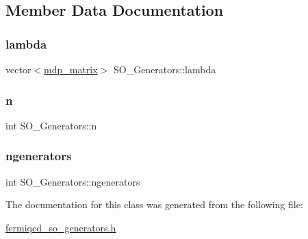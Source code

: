 \subsection{Member Data Documentation}
\mbox{\label{class_s_o___generators_af8407ee230e86dd617df950413ce01cd}} 
\subsubsection{\texorpdfstring{lambda}{lambda}}
{\footnotesize\ttfamily vector$<$\hyperlink{classmdp__matrix}{mdp\+\_\+matrix}$>$ S\+O\+\_\+\+Generators\+::lambda}

\mbox{\label{class_s_o___generators_afb2df00492fe0d24e7c862015f8e9476}} 
\subsubsection{\texorpdfstring{n}{n}}
{\footnotesize\ttfamily int S\+O\+\_\+\+Generators\+::n}

\mbox{\label{class_s_o___generators_aa44e42d7afbb4c6585c58474616781a6}} 
\subsubsection{\texorpdfstring{ngenerators}{ngenerators}}
{\footnotesize\ttfamily int S\+O\+\_\+\+Generators\+::ngenerators}



The documentation for this class was generated from the following file\+:\begin{DoxyCompactItemize}
\item 
\hyperlink{fermiqcd__so__generators_8h}{fermiqcd\+\_\+so\+\_\+generators.\+h}\end{DoxyCompactItemize}
